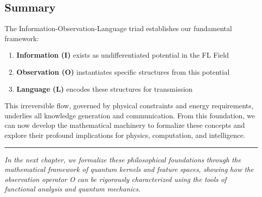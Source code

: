 \subsection{Summary}\label{summary}

The Information-Observation-Language triad establishes our fundamental
framework:

\begin{enumerate}
\def\labelenumi{\arabic{enumi}.}
\tightlist
\item
  \textbf{Information (I)} exists as undifferentiated potential in the
  FL Field
\item
  \textbf{Observation (O)} instantiates specific structures from this
  potential
\item
  \textbf{Language (L)} encodes these structures for transmission
\end{enumerate}

This irreversible flow, governed by physical constraints and energy
requirements, underlies all knowledge generation and communication. From
this foundation, we can now develop the mathematical machinery to
formalize these concepts and explore their profound implications for
physics, computation, and intelligence.

\begin{center}\rule{0.5\linewidth}{0.5pt}\end{center}

\emph{In the next chapter, we formalize these philosophical foundations
through the mathematical framework of quantum kernels and feature
spaces, showing how the observation operator O can be rigorously
characterized using the tools of functional analysis and quantum
mechanics.}

